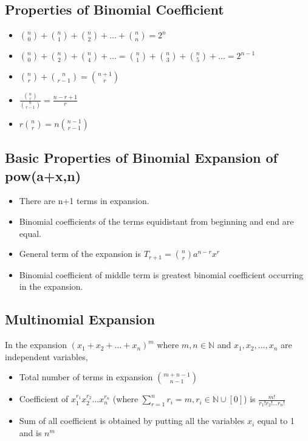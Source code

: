 \documentclass[12pt]{article}
\begin{document}
\subsection{Properties of Binomial Coefficient}
\begin{itemize}
\item $\binom{n}{0}+\binom{n}{1}+\binom{n}{2}+...+\binom{n}{n}=2^n$
\item $\binom{n}{0}+\binom{n}{2}+\binom{n}{4}+...=\binom{n}{1}+\binom{n}{3}+\binom{n}{5}+...=2^{n-1}$
\item $\binom{n}{r}+\binom{n}{r-1}=\binom{n+1}{r}$
\item $\frac{ \binom{n}{r} }{ \binom{n}{r-1}}=\frac{n-r+1}{r}$
\item $r\binom{n}{r}=n\binom{n-1}{r-1}$
\end{itemize}
\subsection{Basic Properties of Binomial Expansion of pow(a+x,n)}
\begin{itemize}
\item There are n+1 terms in expansion.
\item Binomial coefficients of the terms equidistant from beginning and end are equal.
\item General term of the expansion is $T_{r+1}=\binom{n}{r}a^{n-r}x^r$
\item Binomial coefficient of middle term is greatest binomial coefficient occurring in the expansion.
\end{itemize}
\subsection{Multinomial Expansion}
In the expansion $(x_1+x_2+...+x_n)^m$ where $m,n \in \mathbb{N}$ and $x_1,x_2,...,x_n$ are independent variables,
\begin{itemize}
\item Total number of terms in expansion $\binom{m+n-1}{n-1}$
\item Coefficient of $x_1^{r_1}x_2^{r_2}... x_n^{r_n}$ (where $\sum_{r=1}^{n}r_i=m,r_i \in \mathbb{N} \cup [0]$) is $\frac{m!}{r_1! r_2! ... r_n!}$
\item Sum of all coefficient is obtained by putting all the variables $x_i$ equal to 1 and is $n^m$
\end{itemize}
\end{document}
